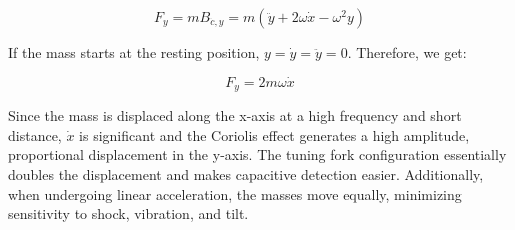\begin{equation}
    F_y=mB_{\ddot{c}, y} = m(\ddot{y}+2\omega\dot{x}-\omega^2y)
\end{equation}

If the mass starts at the resting position, $y=\dot{y}=\ddot{y}=0$. Therefore, we get:

\begin{equation}
    F_y=2m\omega\dot{x}
\end{equation}

Since the mass is displaced along the x-axis at a high frequency and short distance, $\dot{x}$ is significant and the Coriolis effect generates a high amplitude, proportional displacement in the y-axis. The tuning fork configuration essentially doubles the displacement and makes capacitive detection easier. Additionally, when undergoing linear acceleration, the masses move equally, minimizing sensitivity to shock, vibration, and tilt.